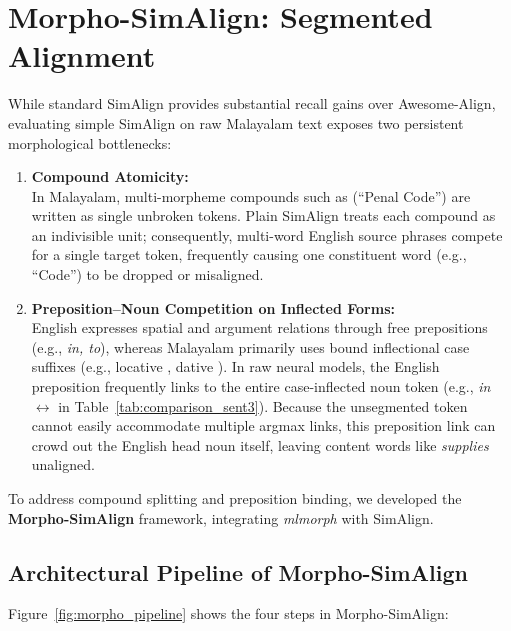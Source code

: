 \FloatBarrier


\section[Morpho-SimAlign: Segmented Alignment]{Morpho-SimAlign: Segmented Alignment}
\label{sec:morpho_simalign}

While standard SimAlign provides substantial recall gains over Awesome-Align, evaluating simple SimAlign on raw Malayalam text exposes two persistent morphological bottlenecks:
\begin{enumerate}[noitemsep]
    \item \textbf{Compound Atomicity:}\\
    In Malayalam, multi-morpheme compounds such as  (``Penal Code'') are written as single unbroken tokens. Plain SimAlign treats each compound as an indivisible unit; consequently, multi-word English source phrases compete for a single target token, frequently causing one constituent word (e.g., ``Code'') to be dropped or misaligned.
    \item \textbf{Preposition--Noun Competition on Inflected Forms:}\\
    English expresses spatial and argument relations through free prepositions (e.g., \textit{in, to}), whereas Malayalam primarily uses bound inflectional case suffixes (e.g., locative , dative ). In raw neural models, the English preposition frequently links to the entire case-inflected noun token (e.g., \textit{in} $\leftrightarrow$  in Table~\ref{tab:comparison_sent3}). Because the unsegmented token cannot easily accommodate multiple argmax links, this preposition link can crowd out the English head noun itself, leaving content words like \textit{supplies} unaligned.
\end{enumerate}

To address compound splitting and preposition binding, we developed the \textbf{Morpho-SimAlign} framework, integrating \textit{mlmorph} with SimAlign.



\subsection{Architectural Pipeline of Morpho-SimAlign}
Figure~\ref{fig:morpho_pipeline} shows the four steps in Morpho-SimAlign:

